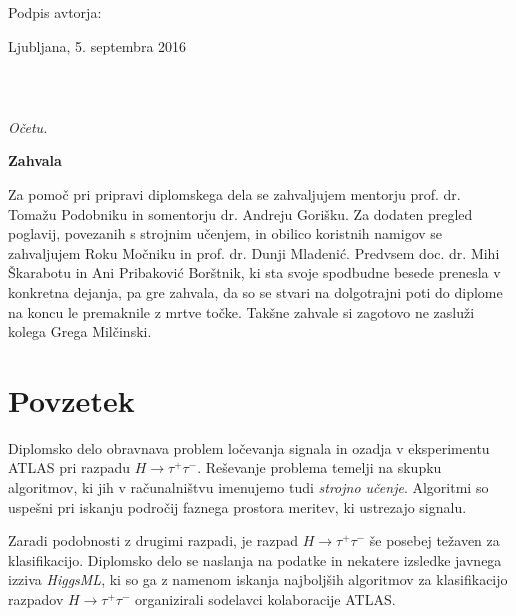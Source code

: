 \vspace{1cm}
\hspace{9cm} Podpis avtorja:

\vspace{2cm}

Ljubljana, 5. septembra 2016 
\newpage

\ \thispagestyle{empty}
\newpage

\thispagestyle{empty}

$\;$ 

\vspace{5cm}
\hfill {\Large \em Očetu.}
\thispagestyle{empty}

\vfill
{\LARGE \textbf{Zahvala}}
\vspace{0.5cm}

Za pomoč pri pripravi diplomskega dela se zahvaljujem mentorju prof. dr. Tomažu Podobniku in somentorju dr. Andreju Gorišku. Za dodaten pregled poglavij, povezanih s strojnim učenjem, in obilico koristnih namigov se zahvaljujem Roku Močniku in prof. dr. Dunji Mladenić. Predvsem doc. dr. Mihi Škarabotu in Ani Pribaković Borštnik, ki sta svoje spodbudne besede prenesla v konkretna dejanja, pa gre zahvala, da so se stvari na dolgotrajni poti do diplome na koncu le premaknile z mrtve točke. Takšne zahvale si zagotovo ne zasluži kolega Grega Milčinski.



\newpage
\setlength{\parindent}{0.7cm}
\setlength{\parskip}{0.1cm}


\chapter*{Povzetek}
\noindent Diplomsko delo obravnava problem ločevanja signala in ozadja v eksperimentu ATLAS pri razpadu $H \rightarrow \tau^+\tau^-$. Reševanje problema temelji na skupku algoritmov, ki jih v računalništvu imenujemo tudi \textit{strojno učenje}. Algoritmi so uspešni pri iskanju področij faznega prostora meritev, ki ustrezajo signalu.

Zaradi podobnosti z drugimi razpadi, je razpad $H \rightarrow \tau^+\tau^-$ še posebej težaven za klasifikacijo. Diplomsko delo se naslanja na podatke in nekatere izsledke javnega izziva \textit{HiggsML}, ki so ga z namenom iskanja najboljših algoritmov za klasifikacijo razpadov $H \rightarrow \tau^+\tau^-$ organizirali sodelavci kolaboracije ATLAS.

